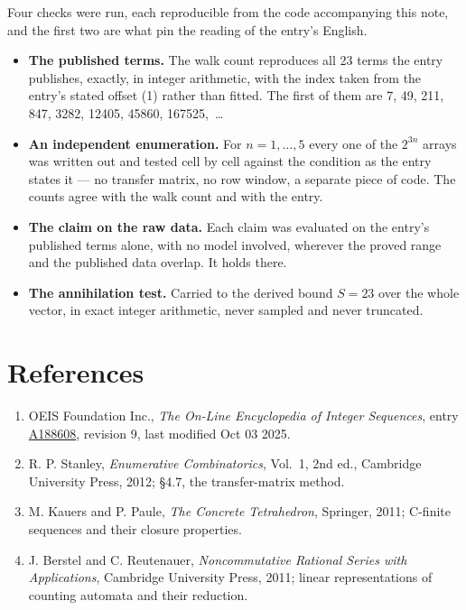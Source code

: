 \documentclass[11pt]{article}
\theoremstyle{definition}
\begin{document}
Four checks were run, each reproducible from the code accompanying this note, and the first two are what pin the reading of the entry's English.

\begin{itemize}

\item {\bfseries The published terms.} The walk count reproduces all 23 terms the entry publishes, exactly, in integer arithmetic, with the index taken from the entry's stated offset (1) rather than fitted. The first of them are 7, 49, 211, 847, 3282, 12405, 45860, 167525,~\dots

\item {\bfseries An independent enumeration.} For $n = 1,\dots,5$ every one of the $2^{3n}$ arrays was written out and tested cell by cell against the condition as the entry states it --- no transfer matrix, no row window, a separate piece of code. The counts agree with the walk count and with the entry.

\item {\bfseries The claim on the raw data.} Each claim was evaluated on the entry's published terms alone, with no model involved, wherever the proved range and the published data overlap. It holds there.

\item {\bfseries The annihilation test.} Carried to the derived bound $S = 23$ over the whole vector, in exact integer arithmetic, never sampled and never truncated.

\end{itemize}

\section{References}

\begin{enumerate}

\item OEIS Foundation Inc., \emph{The On-Line Encyclopedia of Integer Sequences}, entry \href{https://oeis.org/A188608}{A188608}, revision 9, last modified Oct 03 2025.

\item R. P. Stanley, \emph{Enumerative Combinatorics}, Vol.~1, 2nd ed., Cambridge University Press, 2012; \S4.7, the transfer-matrix method.

\item M. Kauers and P. Paule, \emph{The Concrete Tetrahedron}, Springer, 2011; C-finite sequences and their closure properties.

\item J. Berstel and C. Reutenauer, \emph{Noncommutative Rational Series with Applications}, Cambridge University Press, 2011; linear representations of counting automata and their reduction.

\end{enumerate}
\end{document}
